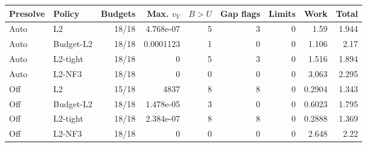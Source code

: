 \begin{tabular}{llrrrrrrr}
\toprule
Presolve & Policy & Budgets & Max. $v_V$ & $B>U$ & Gap flags & Limits & Work & Total\\
\midrule
Auto & L2 & 18/18 & 4.768e-07 & 5 & 3 & 0 & 1.59 & 1.944\\
Auto & Budget-L2 & 18/18 & 0.0001123 & 1 & 0 & 0 & 1.106 & 2.17\\
Auto & L2-tight & 18/18 & 0 & 5 & 3 & 0 & 1.516 & 1.894\\
Auto & L2-NF3 & 18/18 & 0 & 0 & 0 & 0 & 3.063 & 2.295\\
Off & L2 & 15/18 & 4837 & 8 & 8 & 0 & 0.2904 & 1.343\\
Off & Budget-L2 & 18/18 & 1.478e-05 & 3 & 0 & 0 & 0.6023 & 1.795\\
Off & L2-tight & 18/18 & 2.384e-07 & 8 & 8 & 0 & 0.2888 & 1.369\\
Off & L2-NF3 & 18/18 & 0 & 0 & 0 & 0 & 2.648 & 2.22\\
\bottomrule
\end{tabular}
